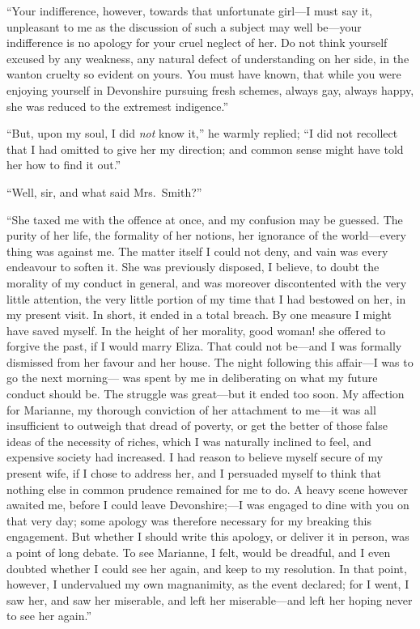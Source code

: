 ``Your indifference, however, towards that unfortunate
girl---I must say it, unpleasant to me as the discussion
of such a subject may well be---your indifference is no
apology for your cruel neglect of her.  Do not think yourself
excused by any weakness, any natural defect of understanding
on her side, in the wanton cruelty so evident on yours.
You must have known, that while you were enjoying yourself
in Devonshire pursuing fresh schemes, always gay,
always happy, she was reduced to the extremest indigence.''

``But, upon my soul, I did \emph{not} know it,'' he warmly
replied; ``I did not recollect that I had omitted to give
her my direction; and common sense might have told her
how to find it out.''

``Well, sir, and what said Mrs.\ Smith?''

``She taxed me with the offence at once, and my confusion
may be guessed.  The purity of her life, the formality
of her notions, her ignorance of the world---every thing
was against me.  The matter itself I could not deny,
and vain was every endeavour to soften it.  She was
previously disposed, I believe, to doubt the morality of my
conduct in general, and was moreover discontented with
the very little attention, the very little portion of my
time that I had bestowed on her, in my present visit.
In short, it ended in a total breach.  By one measure I
might have saved myself.  In the height of her morality,
good woman! she offered to forgive the past, if I would
marry Eliza.  That could not be---and I was formally
dismissed from her favour and her house.  The night
following this affair---I was to go the next morning---%
was spent by me in deliberating on what my future conduct
should be.  The struggle was great---but it ended too soon.
My affection for Marianne, my thorough conviction of her
attachment to me---it was all insufficient to outweigh
that dread of poverty, or get the better of those false
ideas of the necessity of riches, which I was naturally
inclined to feel, and expensive society had increased.
I had reason to believe myself secure of my present wife,
if I chose to address her, and I persuaded myself to think
that nothing else in common prudence remained for me to do.
A heavy scene however awaited me, before I could leave
Devonshire;---I was engaged to dine with you on that very day;
some apology was therefore necessary for my breaking
this engagement.  But whether I should write this apology,
or deliver it in person, was a point of long debate.
To see Marianne, I felt, would be dreadful, and I even doubted
whether I could see her again, and keep to my resolution.
In that point, however, I undervalued my own magnanimity,
as the event declared; for I went, I saw her, and saw
her miserable, and left her miserable---and left her hoping
never to see her again.''

